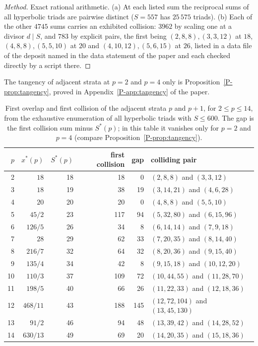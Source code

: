 \documentclass[pdflatex,sn-mathphys-num]{sn-jnl}
\newcommand{\pref}[1]{\ref*{P-#1}}%
\theoremstyle{thmstyleone}%
\theoremstyle{thmstylethree}%
\begin{document}
\begin{proof}[Method]
Exact rational arithmetic. (a) At each listed sum the reciprocal sums of all hyperbolic triads are pairwise distinct ($S=557$ has $25\,575$ triads). (b) Each of the other $4745$ sums carries an exhibited collision: $3962$ by scaling one at a divisor $d\mid S$, and $783$ by explicit pairs, the first being $(2,8,8),(3,3,12)$ at $18$, $(4,8,8),(5,5,10)$ at $20$ and $(4,10,12),(5,6,15)$ at $26$, listed in a data file of the deposit named in the data statement of the paper and each checked directly by a script there.
\end{proof}


The tangency of adjacent strata at $p=2$ and $p=4$ only is Proposition~\pref{prop:tangency}, proved in Appendix~\pref{app:tangency} of the paper.

\begin{table}[t]
\caption{First overlap and first collision of the adjacent strata $p$ and $p+1$, for $2\le p\le14$, from the exhaustive enumeration of all hyperbolic triads with $S\le600$. The gap is the first collision sum minus $S^*(p)$; in this table it vanishes only for $p=2$ and $p=4$ (compare Proposition~\pref{prop:tangency}).}\label{tab:overlap}
\centering\small
\begin{tabular}{@{}rrrrrl@{}}
\toprule
$p$ & $x^*(p)$ & $S^*(p)$ & first collision & gap & colliding pair\\
\midrule
2 & $18$ & 18 & 18 & 0 & $(2,8,8)$ and $(3,3,12)$ \\
3 & $18$ & 19 & 38 & 19 & $(3,14,21)$ and $(4,6,28)$ \\
4 & $20$ & 20 & 20 & 0 & $(4,8,8)$ and $(5,5,10)$ \\
5 & $45/2$ & 23 & 117 & 94 & $(5,32,80)$ and $(6,15,96)$ \\
6 & $126/5$ & 26 & 34 & 8 & $(6,14,14)$ and $(7,9,18)$ \\
7 & $28$ & 29 & 62 & 33 & $(7,20,35)$ and $(8,14,40)$ \\
8 & $216/7$ & 32 & 64 & 32 & $(8,20,36)$ and $(9,15,40)$ \\
9 & $135/4$ & 34 & 42 & 8 & $(9,15,18)$ and $(10,12,20)$ \\
10 & $110/3$ & 37 & 109 & 72 & $(10,44,55)$ and $(11,28,70)$ \\
11 & $198/5$ & 40 & 66 & 26 & $(11,22,33)$ and $(12,18,36)$ \\
12 & $468/11$ & 43 & 188 & 145 & $(12,72,104)$ and $(13,45,130)$ \\
13 & $91/2$ & 46 & 94 & 48 & $(13,39,42)$ and $(14,28,52)$ \\
14 & $630/13$ & 49 & 69 & 20 & $(14,20,35)$ and $(15,18,36)$ \\
\bottomrule
\end{tabular}
\end{table}
\end{document}

